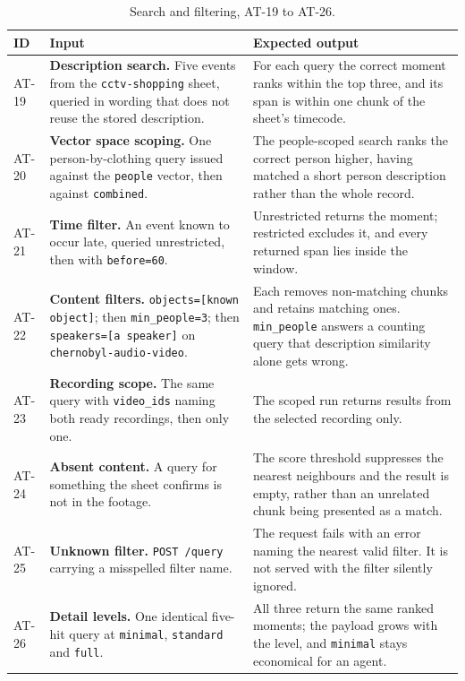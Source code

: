 \documentclass[11pt,a4paper]{article}
\begin{document}
\begin{table}[htbp]
\centering
\scriptsize
\begin{tabularx}{\textwidth}{@{}L{0.85cm}XX@{}}
\toprule
\textbf{ID} & \textbf{Input} & \textbf{Expected output} \\
\midrule
AT-19 & \textbf{Description search.} Five events from the \texttt{cctv-shopping} sheet, queried in wording that does not reuse the stored description. & For each query the correct moment ranks within the top three, and its span is within one chunk of the sheet's timecode. \\
AT-20 & \textbf{Vector space scoping.} One person-by-clothing query issued against the \texttt{people} vector, then against \texttt{combined}. & The people-scoped search ranks the correct person higher, having matched a short person description rather than the whole record. \\
AT-21 & \textbf{Time filter.} An event known to occur late, queried unrestricted, then with \texttt{before=60}. & Unrestricted returns the moment; restricted excludes it, and every returned span lies inside the window. \\
AT-22 & \textbf{Content filters.} \texttt{objects=[known object]}; then \texttt{min\_people=3}; then \texttt{speakers=[a speaker]} on \texttt{chernobyl-audio-video}. & Each removes non-matching chunks and retains matching ones. \texttt{min\_people} answers a counting query that description similarity alone gets wrong. \\
AT-23 & \textbf{Recording scope.} The same query with \texttt{video\_ids} naming both ready recordings, then only one. & The scoped run returns results from the selected recording only. \\
AT-24 & \textbf{Absent content.} A query for something the sheet confirms is not in the footage. & The score threshold suppresses the nearest neighbours and the result is empty, rather than an unrelated chunk being presented as a match. \\
AT-25 & \textbf{Unknown filter.} \texttt{POST /query} carrying a misspelled filter name. & The request fails with an error naming the nearest valid filter. It is not served with the filter silently ignored. \\
AT-26 & \textbf{Detail levels.} One identical five-hit query at \texttt{minimal}, \texttt{standard} and \texttt{full}. & All three return the same ranked moments; the payload grows with the level, and \texttt{minimal} stays economical for an agent. \\
\bottomrule
\end{tabularx}
\caption{Search and filtering, AT-19 to AT-26.}
\end{table}
\end{document}

